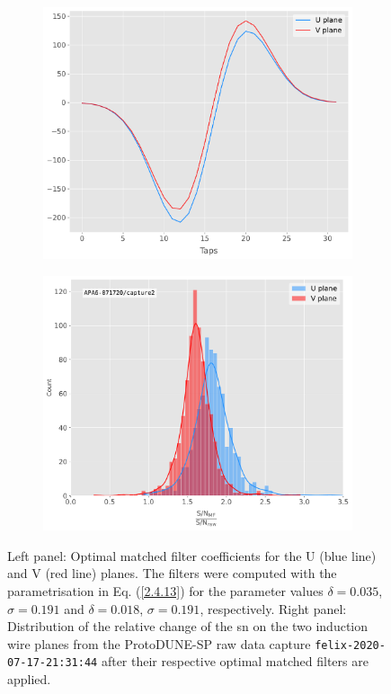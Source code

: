 \begin{figure}[t]
	\begin{subfigure}{0.5\textwidth}
		\centering
		\includegraphics[width=.99\linewidth]{Images/Matched_Filter/optimal_coeffs}
	\end{subfigure}
	\begin{subfigure}{0.5\textwidth}
		\centering
		\includegraphics[width=.99\linewidth]{Images/Matched_Filter/improvement_capture}
	\end{subfigure}
	\caption[Distribution of the change in the \gls{sn} on the induction planes from the ProtoDUNE-SP raw data capture after the optimal matched filters are applied.]{Left panel: Optimal matched filter coefficients for the U (blue line) and V (red line) planes. The filters were computed with the parametrisation in Eq. (\ref{2.4.13}) for the parameter values $\delta = 0.035$, $\sigma = 0.191$ and $\delta = 0.018$, $\sigma = 0.191$, respectively. Right panel: Distribution of the relative change of the \gls{sn} on the two induction wire planes from the ProtoDUNE-SP raw data capture \texttt{felix-2020-07-17-21:31:44} after their respective optimal matched filters are applied.}
	\label{fig:mf_perf}
\end{figure}

